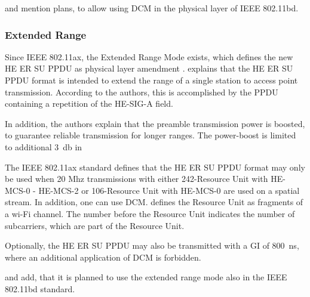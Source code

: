 \textcite{jacob_system-level_2020} and \textcite{triwinarko_phy_2021} mention plans,
to allow using \ac{DCM} in the physical layer of IEEE 802.11bd.

\subsubsection*{Extended Range}
Since IEEE 802.11ax, the Extended Range Mode exists, which defines the new \ac{HE} ER SU \ac{PPDU} as physical layer amendment
\cite{noauthor_ieee_2021,afaqui_ieee_2017} .
\textcite{deng_ieee_2017} explains that the \ac{HE} ER SU \ac{PPDU} format is intended to extend the range of
a single station to access point transmission.
According to the authors, this is accomplished by the \ac{PPDU} containing a repetition of the HE-SIG-A field.

In addition, the authors explain that the preamble transmission power is boosted,
to guarantee reliable transmission for longer ranges.
The power-boost is limited to additional \SI{3}{\decibel}
in  \cite{noauthor_ieee_2021,jacob_system-level_2020}

The IEEE 802.11ax \cite{noauthor_ieee_2021} standard defines that the \ac{HE} ER SU \ac{PPDU} format may only be used
when 20 Mhz transmissions with either 242-Resource Unit with HE-MCS-0 - HE-MCS-2 or 106-Resource Unit with HE-MCS-0 are used on a spatial stream.
In addition, one can use \ac{DCM}.
\textcite{sauter_wireless_2022} defines the Resource Unit as fragments of a wi-Fi channel. The number before the Resource Unit
indicates the number of subcarriers, which are part of the Resource Unit.

Optionally, the \ac{HE} ER SU \ac{PPDU} may also be transmitted with a \ac{GI} of \SI{800}{\nano\second},
where an additional application of \ac{DCM} is forbidden.

\textcite{jacob_system-level_2020} and \textcite{triwinarko_phy_2021} add, that it is planned to use
the extended range mode also in the IEEE 802.11bd standard.

